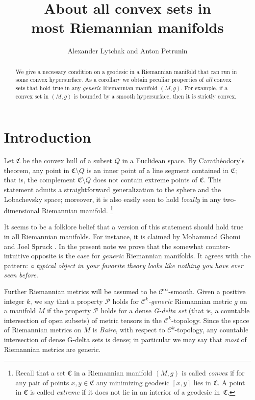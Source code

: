 \documentclass[a4paper,10pt]{article}
\def\thetitle{About all convex sets in\\ most Riemannian manifolds}
\begin{document}
\title{\thetitle}
\author{Alexander Lytchak and Anton Petrunin}
\date{}
\maketitle

\begin{abstract}
We give a necessary condition on a geodesic in a Riemannian manifold that can run in some convex hypersurface.
As a corollary we obtain peculiar properties of \emph{all} convex sets that hold true in any \emph{generic} Riemannian manifold $(M,g)$.
For example, if a convex set in $(M,g)$ is bounded by a smooth hypersurface, then it is strictly convex.
\end{abstract}

\section{Introduction}
Let $\mathfrak{C}$ be the convex hull of a subset $Q$ in a Euclidean space.
By Carathéodory's theorem, any point in $\mathfrak{C}\setminus Q$ is an inner point of a line segment contained in $\mathfrak{C}$;
that is, the complement $\mathfrak{C} \setminus Q$ does not contain extreme points of $\mathfrak{C}$.
This statement admits a straightforward generalization to the sphere and the  Lobachevsky space; moreover, it  is also easily seen to hold \emph{locally} in any two-dimensional Riemannian manifold.%
\footnote{Recall that a set $\mathfrak{C}$ in a Riemannian manifold $(M,g)$ is called \emph{convex} if for any pair of points $x,y\in \mathfrak{C}$ any minimizing geodesic $[x,y]$ lies in $\mathfrak{C}$.
A point in $\mathfrak{C}$ is called \emph{extreme} if it does not lie in an interior of a geodesic in~$\mathfrak{C}$.}

It seems to be a folklore belief that a version of this statement should hold true in all Riemannian manifolds.
For instance, it is claimed by Mohammad Ghomi and Joel Spruck \cite[Lemma 9.1]{Ghomi}.
In the present note we prove that the somewhat counter-intuitive opposite is the case for \emph{generic} Riemannian manifolds.
It agrees with the pattern: \emph{a typical object in your favorite theory looks like nothing you have ever seen before}.

Further Riemannian metrics will be assumed to be $\mathcal C^\infty$-smooth.
Given a positive integer $k$, we say that a property $\mathcal P$ holds for \emph{$\mathcal C^k$-generic} Riemannian metric $g$ on a manifold $M$ 
if the property $\mathcal P$ holds for a dense \emph{G-delta set} (that is, a countable intersection of open subsets) of metric tensors in the $\mathcal C^k$-topology.
Since the space of Riemannian metrics  on $M$ is \emph{Baire}, with  respect to $\mathcal C^k$-topology, any 
countable intersection of dense G-delta sets is dense;
in particular we may say that \emph{most} of Riemannian metrics are generic.
\end{document}
